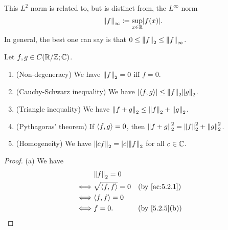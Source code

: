 \begin{note}
  This \(L^2\) norm is related to, but is distinct from, the \(L^\infty\) norm
  \[
    \norm*{f}_\infty \coloneqq \sup_{x \in \R} \abs{f(x)}.
  \]
  In general, the best one can say is that \(0 \leq \norm*{f}_2 \leq \norm*{f}_\infty\).
\end{note}

\setcounter{thm}{6}
\begin{lem}\label{5.2.7}
  Let \(f, g \in C(\R / \Z ; \C)\).
  \begin{enumerate}
    \item (Non-degeneracy)
          We have \(\norm*{f}_2 = 0\) iff \(f = 0\).
    \item (Cauchy-Schwarz inequality)
          We have \(\abs{\inner*{f, g}} \leq \norm*{f}_2 \norm*{g}_2\).
    \item (Triangle inequality)
          We have \(\norm*{f + g}_2 \leq \norm*{f}_2 + \norm*{g}_2\).
    \item (Pythagoras' theorem)
          If \(\inner*{f, g} = 0\), then \(\norm*{f + g}_2^2 = \norm*{f}_2^2 + \norm*{g}_2^2\).
    \item (Homogeneity)
          We have \(\norm*{cf}_2 = \abs{c} \norm*{f}_2\) for all \(c \in \C\).
  \end{enumerate}
\end{lem}

\begin{proof}{(a)}
  We have
  \begin{align*}
         & \norm*{f}_2 = 0                                           \\
    \iff & \sqrt{\inner*{f, f}} = 0 &  & \by{ac:5.2.1}               \\
    \iff & \inner*{f, f} = 0                                         \\
    \iff & f = 0.                   &  & \text{(by \cref{5.2.5}(b))}
  \end{align*}
\end{proof}

